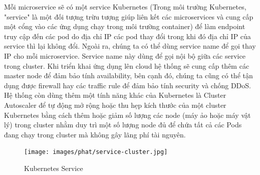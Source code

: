 \noindent Mỗi microservice sẽ có một service Kubernetes (Trong môi trường Kubernetes, "service" là một đối tượng trừu tượng giúp liên kết các microservices và cung cấp một cổng vào các ứng dụng chạy trong môi trường container) để làm endpoint truy cập đến các pod do địa chỉ IP các pod thay đổi trong khi đó địa chỉ IP của service thì lại không đổi. Ngoài ra, chúng ta có thể dùng service name để gọi thay IP cho mỗi microservice. Service name này dùng để gọi nội bộ giữa các service trong cluster. Khi triển khai ứng dụng lên cloud hệ thống sẽ cung cấp thêm các master node để đảm bảo tính availability, bên cạnh đó, chúng ta cũng có thể tận dụng được firewall hay các traffic rule để đảm bảo tính security và chống DDoS.\\[0.5cm]
\noindent Hệ thống còn dùng thêm một tính năng khác của Kubernetes là Cluster Autoscaler để tự động mở rộng hoặc thu hẹp kích thước của một cluster Kubernetes bằng cách thêm hoặc giảm số lượng các node (máy ảo hoặc máy vật lý) trong cluster nhằm duy trì một số lượng node đủ để chứa tất cả các Pods đang chạy trong cluster mà không gây lãng phí tài nguyên.
 \begin{figure}[H]
    \begin{center}
    \texttt{[image: images/phat/service-cluster.jpg]}
    \vspace*{7mm}
    \caption{Kubernetes Service}
    \end{center}
    \label{}
\end{figure}

